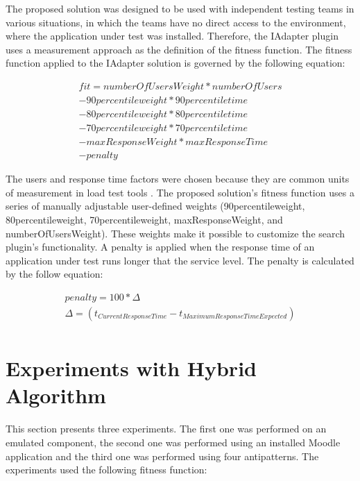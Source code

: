 \documentclass{report}
\begin{document}
The proposed solution was designed to be used with independent testing teams in various situations, in which the teams have no direct access to the environment, where the application under test was installed. Therefore, the IAdapter plugin uses a measurement approach as the definition of the fitness function. The fitness function applied to the IAdapter solution is governed by the following equation:

\begin{equation}
\begin{aligned}
fit=numberOfUsersWeight*numberOfUsers\\
-90percentileweight* 90percentiletime\\
-80percentileweight*80percentiletime\\
-70percentileweight*70percentiletime\\
-maxResponseWeight*maxResponseTime\\
-penalty
\end{aligned}
\end{equation}

The users and response time factors were chosen because they are common units of measurement in load test tools \cite{Sandler2004}. The proposed solution's fitness function uses a series of manually adjustable user-defined weights (90percentileweight, 80percentileweight,  70percentileweight, maxResponseWeight, and numberOfUsersWeight). These weights make it possible to customize the search plugin's functionality. A penalty is applied when the response time of an application under test runs longer that the service level. The penalty is calculated by the follow equation:

\begin{equation}
\begin{aligned}
penalty=100 * \Delta \\
\Delta=(t_{Current Response Time} - t_{Maximum Response Time Expected})\\
\end{aligned}
\end{equation}

\section{Experiments with Hybrid Algorithm}

This section presents three experiments. The first one was performed on an emulated component, the second one was performed using an installed Moodle application and the third one was performed using four antipatterns. The experiments used the following fitness function:
\end{document}
